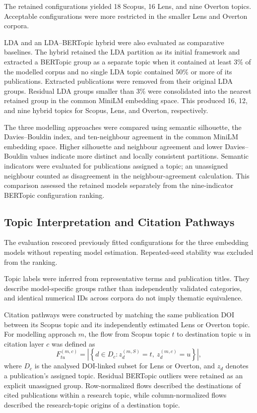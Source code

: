 \documentclass[a4paper,fleqn]{cas-sc}
\begin{document}
    
    The retained configurations yielded 18 Scopus, 16 Lens, and nine Overton topics. Acceptable configurations were more restricted in the smaller Lens and Overton corpora.
    
    LDA and an LDA--BERTopic hybrid were also evaluated as comparative baselines. The hybrid retained the LDA partition as its initial framework and extracted a BERTopic group as a separate topic when it contained at least 3\% of the modelled corpus and no single LDA topic contained 50\% or more of its publications. Extracted publications were removed from their original LDA groups. Residual LDA groups smaller than 3\% were consolidated into the nearest retained group in the common MiniLM embedding space. This produced 16, 12, and nine hybrid topics for Scopus, Lens, and Overton, respectively.
    
    The three modelling approaches were compared using semantic silhouette, the Davies--Bouldin index, and ten-neighbour agreement in the common MiniLM embedding space. Higher silhouette and neighbour agreement and lower Davies--Bouldin values indicate more distinct and locally consistent partitions. Semantic indicators were evaluated for publications assigned a topic; an unassigned neighbour counted as disagreement in the neighbour-agreement calculation. This comparison assessed the retained models separately from the nine-indicator BERTopic configuration ranking.
    
    \subsection{Topic Interpretation and Citation Pathways}\label{sec:topic_interpretation}
    
    
    The evaluation rescored previously fitted configurations for the three embedding models without repeating model estimation. Repeated-seed stability was excluded from the ranking.
    
    Topic labels were inferred from representative terms and publication titles. They describe model-specific groups rather than independently validated categories, and identical numerical IDs across corpora do not imply thematic equivalence.
    
    Citation pathways were constructed by matching the same publication DOI between its Scopus topic and its independently estimated Lens or Overton topic. For modelling approach $m$, the flow from Scopus topic $t$ to destination topic $u$ in citation layer $c$ was defined as
    \begin{equation}
    F_{tu}^{(m,c)}=\left|\left\{d\in D_c:z_d^{(m,S)}=t,\ z_d^{(m,c)}=u\right\}\right|,
    \end{equation}
    where $D_c$ is the analysed DOI-linked subset for Lens or Overton, and $z_d$ denotes a publication's assigned topic. Residual BERTopic outliers were retained as an explicit unassigned group. Row-normalized flows described the destinations of cited publications within a research topic, while column-normalized flows described the research-topic origins of a destination topic.
    
\end{document}
